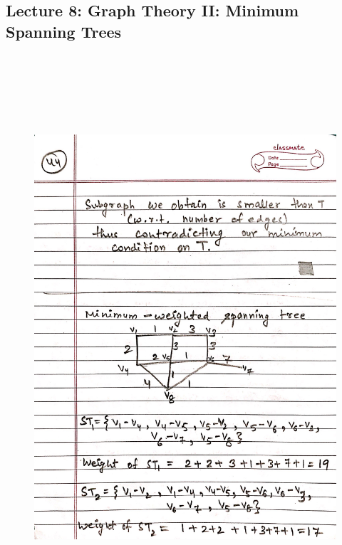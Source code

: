 \newpage
{\color{black} \subsection*{Lecture 8: Graph Theory II: Minimum Spanning Trees}}
\begin{figure}[H]
    \centering
    \includegraphics[width=16cm, height=21cm]{"./MIT-6.042J/MIT-6042J-044"}
\end{figure}

